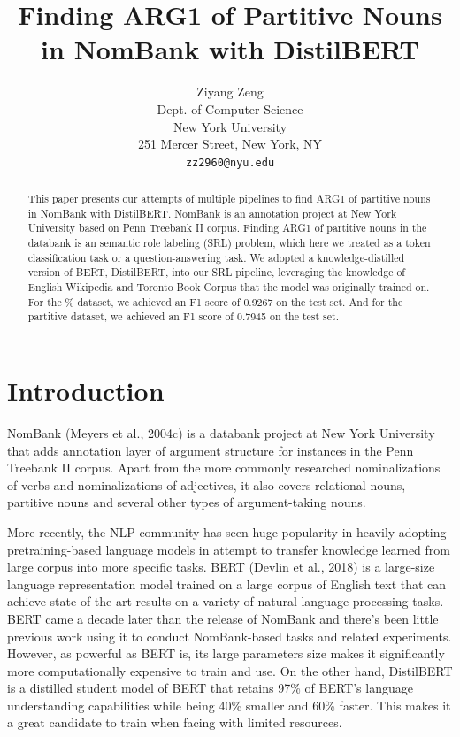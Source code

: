 \documentclass[11pt]{article}
\title{Finding ARG1 of Partitive Nouns in NomBank with DistilBERT}
\author{Ziyang Zeng \\
  Dept. of Computer Science \\
  New York University \\
  251 Mercer Street, New York, NY \\
  \texttt{zz2960@nyu.edu}}
\begin{document}
\maketitle
\begin{abstract}
  This paper presents our attempts of multiple pipelines to find ARG1 of partitive nouns in NomBank with DistilBERT. NomBank is an annotation project at New York University based on Penn Treebank II corpus. Finding ARG1 of partitive nouns in the databank is an semantic role labeling (SRL) problem, which here we treated as a token classification task or a question-answering task. We adopted a knowledge-distilled version of BERT, DistilBERT, into our SRL pipeline, leveraging the knowledge of English Wikipedia and Toronto Book Corpus that the model was originally trained on. For the \% dataset, we achieved an F1 score of 0.9267 on the test set. And for the partitive dataset, we achieved an F1 score of 0.7945 on the test set.
\end{abstract}

\section{Introduction}

NomBank (Meyers et al., 2004c) is a databank project at New York University that adds annotation layer of argument structure for instances in the Penn Treebank II corpus. Apart from the more commonly researched nominalizations of verbs and nominalizations of adjectives, it also covers relational nouns, partitive nouns and several other types of argument-taking nouns.

More recently, the NLP community has seen huge popularity in heavily adopting pretraining-based language models in attempt to transfer knowledge learned from large corpus into more specific tasks. BERT (Devlin et al., 2018) is a large-size language representation model trained on a large corpus of English text that can achieve state-of-the-art results on a variety of natural language processing tasks. BERT came a decade later than the release of NomBank and there's been little previous work using it to conduct NomBank-based tasks and related experiments. However, as powerful as BERT is, its large parameters size makes it significantly more computationally expensive to train and use. On the other hand, DistilBERT is a distilled student model of BERT that retains 97\% of BERT's language understanding capabilities while being 40\% smaller and 60\% faster. This makes it a great candidate to train when facing with limited resources.
\end{document}
